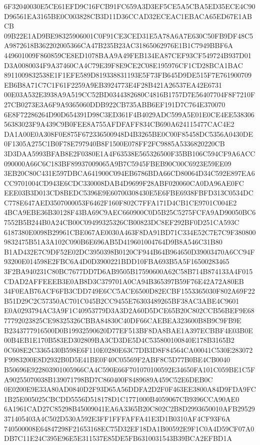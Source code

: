 \documentclass[UTF8,fontset=fandol,zihao=-4,a4paper]{ctexart}
\begin{document}
{{6F32040030E5CE61EFD9C16FCB91FC659A3D3EF5CE5A5CBA5ED35ECE4C90D96561EA3165BE0C003828CB3D11D36CCAD32ECEAC1EBACA65ED67E1ABCB
09B22E1AD9BE98325906001C0F91CE3CED31E5A78A6A7E630C50FB9DF48C5A9872618B362202005366CA47B235B23AC31865062976E1B1C7949BBF6A
449601009F860859CE8ED1078BAA9A49FEB134EA87CEF93CF549724B937D01D3A0080034F9A37460CA4C79E39F8E9CE2C08E195976CF1CD28BCA1BAC
8911009832538E1F1EFE589D819338831193E5F73FB645D9DE515F7E761900709EB6B8A71C7C1F61F2259A9EB3924773E4F28B421A26537EA42E6731
00E03A532E3938A9A519CC52BD0344382680C4816B1757D7E56407704F8F7210F27CB0273E3A6F9A9365060DDB922CB735ABB6EF191D7C764E370070
6E8F72286264D90D654391D98C3ED361F4B4029ADC599A5E01E0CE4EE53830656383023F9A439C9B0FEE8A755AFDFAFF834CB690A624115477CAC4E2
DA1A00E0A308F0E875F672336500948D4B3265BE0C00F85458DC5356A0430DE0F1305A275C1B0F78E797940B8F1500E078FF2FC9885A5336820220CB
3D3DAA5993BFAB8E2F0380E1A4F63538E565326500F35BB106C594CF9A6ACC090000A66C6C183BF89937009065A9B7C5945FBEB90C00C6923E59EE09
3EB20C80C431E597DBCA641900C094EB6786BDA66CD80064D34C592E897EA6CC9701004CD943E6CDC330008DAB4D9699F28ABF020060CA0DA96AE0FC
EEE03B3D013CD8BEDC5396E9E60700308430E5E6FBE6938FBFD313C0534DCC778E647AED3507000053F6462F160F802C7FFA171D4CB1CE9701C004E2
4BCA9EBE36B30128F43BA69C9AEC660900C0D5B25C5275FCFA9AD90050BC67552B5B244B0A24CB00C09499325326CB00823DC8EF292BF0D251CA593C
6187380E0098B29961CBE067AE0030A463F8DA91BD71C334E52C7E7C9F3808009832475B51A3A102C090B6E696AB5D419601004764D9B8A546C31B80
B1AD432E7C9DF52E02DC3950398B0120CF944B64B964650D39003470A6CC94F93200E014598E2FBC6A4D0D3900221BDD10FBA693B5A5F16500283465
3F2BA940231C80BC7677DD7D6AB9505B17590600A62C58B714B874133A4F015CDAD2AFFEEEB3E0AB8D3C379701A0CA94B365397B59F76E42A72A80EB
34F0EAB76ACF6FB3CDD749E6CC5ACE6500D82ECBF1553365030F802A69F22B51D29C2C57350AC701C045B2CC9455E76303489265BF38AC3ABE4C9601
E0A0293794AC3A9F1C40953779D3A3D2A60D5DCE65B20C802CCB56BEF9E6877792023825CE98325326CBBA84830C40DF66CAEBEA323600B8B9C9FB9E
B2343777916500D0B19932590620D77EF513BF8DA8BAE1A397ECBBF4E03B0E00B4EB1E170B583ED302809BA3CD3DE5D4C535800100840E178B3165B2
0C608E2C3365430B598E6F110E0280E63C7DB3D8F84564CA00041C530E283072F9983200E8D2932B0D5E41BE0F40C05569F2ABF8C5D77B0BE4CB0040
B50696E922803901005966CA4C590E66F701070100592E34650FA101C059BE1C5FA90255070038B139071798BD7C860400F8489689A459C52E6DEB0C
0E0200E9E33A80AD0840D2F93D65A56DDFA2D2F0F463EE3800A84D9FDA9FC1B25E005025CBCDD5556D518178D1C1771000B4059067CB9396CCA90AE0
6A1961CAD27C85298B45009041EA6A3365B20C802C2B8D2993650010AFB29529371405403A4C502D530A592E3FF1FFFAFFA41E3D1B0310AF4CF93F6A
740500008E64847298F21653168EC75D32EF18DA1B00592E9F1C0A4D59CF07A0DB7C11E24C395E96E5E311537E85DE5FB6310031543B39BCA2EFBD1A
}}
\end{document}
